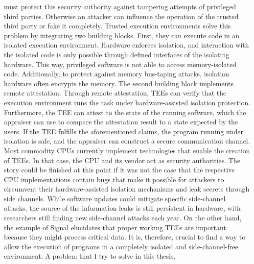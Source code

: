 must protect this security authority against tampering attempts of privileged
third parties. Otherwise an attacker can influence the operation of the trusted
third party or fake it completely. Trusted execution environments solve this
problem by integrating two building blocks. First, they can execute code in an
isolated execution environment. Hardware enforces isolation, and interaction
with the isolated code is only possible through defined interfaces of the
isolating hardware. This way, privileged software is not able to access
memory-isolated code. Additionally, to protect against memory bus-taping
attacks, isolation hardware often encrypts the memory. The second building block
implements remote attestation. Through remote attestation, TEEs can verify that
the execution environment runs the task under hardware-assisted isolation
protection. Furthermore, the TEE can attest to the state of the running
software, which the appraiser can use to compare the attestation result to a
state expected by the users. If the TEE fulfills the aforementioned claims, the
program running under isolation is safe, and the appraiser can construct a
secure communication channel.\\

Most commodity CPUs currently implement technologies that enable the creation of
TEEs. In that case, the CPU and its vendor act as security
authorities.\cite{tdx_whitepaper,kaplan_amd_2020,pinto_demystifying_2019,costan2016intel}
The story could be finished at this point if it was not the case that the
respective CPU implementations contain bugs that make it possible for attackers
to circumvent their hardware-assisted isolation mechanisms and leak secrets
through side
channels.\cite{kocher_spectre_2020,lipp_meltdown_2020,nilsson_survey_2020} While
software updates could mitigate specific side-channel attacks, the source of the
information leaks is still persistent in hardware, with researchers still
finding new side-channel attacks each
year.\cite{wikner2022retbleed,moghimi_downfall_2023,ragab_ghostrace_2024} On the
other hand, the example of Signal elucidates that proper working TEEs are
important because they might process critical data. It is, therefore, crucial to
find a way to allow the execution of programs in a completely isolated and
side-channel-free environment. A problem that I try to solve in this thesis.
